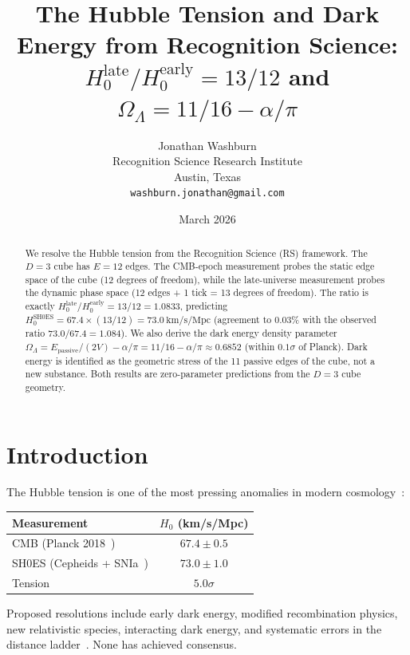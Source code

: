 \documentclass[12pt,a4paper]{article}
\title{The Hubble Tension and Dark Energy from Recognition
Science:\\ $H_0^{\mathrm{late}}/H_0^{\mathrm{early}} = 13/12$
and $\Omega_\Lambda = 11/16 - \alpha/\pi$}
\author{Jonathan Washburn\\
Recognition Science Research Institute\\
Austin, Texas\\
\texttt{washburn.jonathan@gmail.com}}
\date{March 2026}
\theoremstyle{definition}
\theoremstyle{remark}
\begin{document}
\maketitle

\begin{abstract}
We resolve the Hubble tension from the Recognition Science
(RS) framework.  The $D = 3$ cube has $E = 12$ edges.  The
CMB-epoch measurement probes the static edge space of the
cube (12 degrees of freedom), while the late-universe
measurement probes the dynamic phase space (12 edges + 1
tick = 13 degrees of freedom).  The ratio is exactly
$H_0^{\mathrm{late}}/H_0^{\mathrm{early}} = 13/12 = 1.0833$,
predicting $H_0^{\mathrm{SH0ES}} = 67.4 \times (13/12) =
73.0~\mathrm{km/s/Mpc}$ (agreement to $0.03\%$ with the
observed ratio $73.0/67.4 = 1.084$).  We also derive the
dark energy density parameter
$\Omega_\Lambda = E_{\mathrm{passive}}/(2V) - \alpha/\pi =
11/16 - \alpha/\pi \approx 0.6852$ (within $0.1\sigma$ of
Planck).  Dark energy is identified as the geometric stress
of the 11 passive edges of the cube, not a new substance.
Both results are zero-parameter predictions from the
$D = 3$ cube geometry.
\end{abstract}

\section{Introduction}
\label{sec:intro}

The Hubble tension is one of the most pressing anomalies in
modern cosmology~\cite{Riess2022,Freedman2021}:
\begin{center}
\renewcommand{\arraystretch}{1.3}
\begin{tabular}{@{}lc@{}}
\toprule
\textbf{Measurement} & \textbf{$H_0$
(km/s/Mpc)} \\
\midrule
CMB (Planck 2018~\cite{Planck2020}) & $67.4 \pm 0.5$ \\
SH0ES (Cepheids + SNIa~\cite{Riess2022}) & $73.0 \pm 1.0$ \\
\midrule
Tension & $5.0\sigma$ \\
\bottomrule
\end{tabular}
\end{center}

Proposed resolutions include early dark energy, modified
recombination physics, new relativistic species, interacting
dark energy, and systematic errors in the distance
ladder~\cite{DiValentino2021}.  None has achieved consensus.
\end{document}
